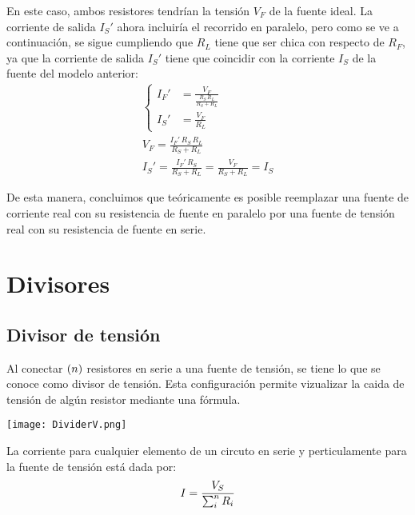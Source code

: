 \documentclass[a5paper,12pt,twoside]{book}
\begin{document}
En este caso, ambos resistores tendrían la tensión $V_F$ de la fuente ideal. La corriente de salida $I_S'$ ahora incluiría el recorrido en paralelo, pero como se ve a continuación, se sigue cumpliendo que $R_L$ tiene que ser chica con respecto de $R_F$, ya que la corriente de salida $I_S'$ tiene que coincidir con la corriente $I_S$ de la fuente del modelo anterior:
\begin{gather*}
    \left\{
    \begin{aligned}
        I_F' &= \frac{V_F}{\frac{R_S \, R_L}{R_S + R_L}}
        \\[1ex]
        I_S' &= \frac{V_F}{R_L}
    \end{aligned}
    \right.
    \\[1em]
    V_F = \frac{I_F' \, R_S \, R_L}{R_S + R_L}
    \\[1em]
    I_S' = \frac{I_F' \, R_S}{R_S + R_L} = \frac{V_F}{R_S + R_L} = I_S
\end{gather*}

De esta manera, concluimos que teóricamente es posible reemplazar una fuente de corriente real con su resistencia de fuente en paralelo por una fuente de tensión real con su resistencia de fuente en serie.




\section{Divisores}

\subsection*{Divisor de tensión}

Al conectar $(n)$ resistores en serie a una fuente de tensión, se tiene lo que se conoce como divisor de tensión. Esta configuración permite vizualizar la caida de tensión de algún resistor mediante una fórmula.

\begin{center}
    \texttt{[image: DividerV.png]}
\end{center}

La corriente para cualquier elemento de un circuto en serie y perticulamente para la fuente de tensión está dada por:
\begin{equation*}
    I = \frac{V_S}{\sum_i^n R_i}
\end{equation*}
\end{document}
